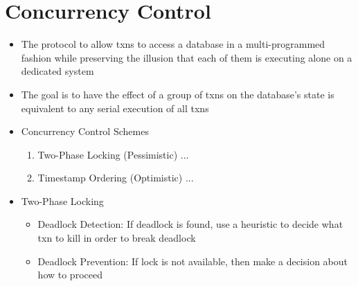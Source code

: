 \documentclass[11pt]{article}
\begin{document}
\section{Concurrency Control}
\begin{itemize}
    \item The protocol to allow txns to access a database in a multi-programmed fashion while preserving the illusion that each of them is executing alone on a dedicated system
    \item The goal is to have the effect of a group of txns on the database's state is equivalent to any serial execution of all txns
    \item Concurrency Control Schemes
    \begin{enumerate}
        \item Two-Phase Locking (Pessimistic) ...
        \item Timestamp Ordering (Optimistic) ...
    \end{enumerate}
    \item Two-Phase Locking
    \begin{itemize}
        \item Deadlock Detection: If deadlock is found, use a heuristic to decide what txn to kill in order to break deadlock
        \item Deadlock Prevention: If lock is not available, then make a decision about how to proceed
    \end{itemize}
\end{itemize}
\end{document}
